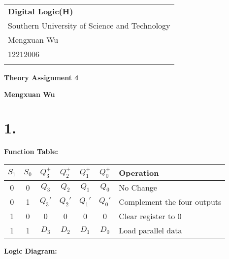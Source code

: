 \documentclass[a4paper,12pt]{article}
\begin{document}
\thispagestyle{empty} %

\begin{tabular}{p{15.5cm}}
{\large \bf Digital Logic(H)} \\
Southern University of Science and Technology \\ Mengxuan Wu \\ 12212006 \\
\hline
\\
\end{tabular}

\vspace*{0.3cm} %

\begin{center}
	{\Large \bf Theory Assignment 4}
	\vspace{2mm}

	{\bf Mengxuan Wu}
		
\end{center}  

\vspace{0.4cm}

\section*{1.}

\textbf{Function Table:}

\begin{center}
	\begin{tabular}{ccccccl}
		\toprule
		$S_1$ & $S_0$ & $Q_3^+$ & $Q_2^+$ & $Q_1^+$ & $Q_0^+$ & Operation \\
		\midrule
		0 & 0 & $Q_3$ & $Q_2$ & $Q_1$ & $Q_0$ & No Change \\
		0 & 1 & $Q_3'$ & $Q_2'$ & $Q_1'$ & $Q_0'$ & Complement the four outputs \\
		1 & 0 & 0 & 0 & 0 & 0 & Clear register to 0 \\
		1 & 1 & $D_3$ & $D_2$ & $D_1$ & $D_0$ & Load parallel data \\
		\bottomrule
	\end{tabular}
\end{center}

\textbf{Logic Diagram:}
\end{document}
